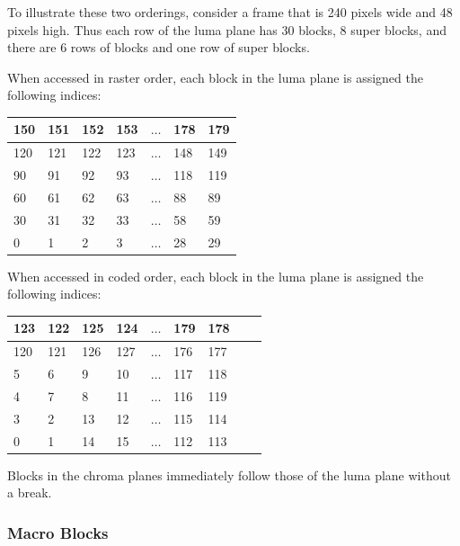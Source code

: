 \documentclass[11pt,letterpaper]{article}
\begin{document}
To illustrate these two orderings, consider a frame that is 240 pixels wide and
 48 pixels high.
Thus each row of the luma plane has 30 blocks, 8 super blocks, and there are 6
 rows of blocks and one row of super blocks.

When accessed in raster order, each block in the luma plane is assigned the
 following indices:

\vspace{\baselineskip}
\begin{tabular}{|l|l|l|l|c|l|l|}\hline
150 & 151 & 152 & 153 & $\ldots$ & 178 & 179 \\\hline
120 & 121 & 122 & 123 & $\ldots$ & 148 & 149 \\\hline
 90 &  91 &  92 &  93 & $\ldots$ & 118 & 119 \\\hline
 60 &  61 &  62 &  63 & $\ldots$ &  88 &  89 \\\hline
 30 &  31 &  32 &  33 & $\ldots$ &  58 &  59 \\\hline
  0 &   1 &   2 &   3 & $\ldots$ &  28 &  29 \\\hline
\end{tabular}
\vspace{\baselineskip}

When accessed in coded order, each block in the luma plane is assigned the
 following indices:

\vspace{\baselineskip}
\begin{tabular}{|l|l|l|l|c|l|l|l|l|}\hline
123 & 122 & 125 & 124 & $\ldots$ & 179 & 178 \\\hline
120 & 121 & 126 & 127 & $\ldots$ & 176 & 177 \\\hline
  5 &   6 &   9 &  10 & $\ldots$ & 117 & 118 \\\hline
  4 &   7 &   8 &  11 & $\ldots$ & 116 & 119 \\\hline
  3 &   2 &  13 &  12 & $\ldots$ & 115 & 114 \\\hline
  0 &   1 &  14 &  15 & $\ldots$ & 112 & 113 \\\hline
\end{tabular}
\vspace{\baselineskip}

Blocks in the chroma planes immediately follow those of the luma plane without
 a break.

\subsubsection{Macro Blocks}
\end{document}
